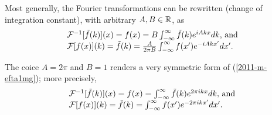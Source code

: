 Most generally, the Fourier transformations can be rewritten (change of integration constant),
 with arbitrary $A,B\in {\Bbb R}$,
as
\begin{equation}
\begin{array}{l}
 {\cal F}^{-1}[\tilde{f}(k)](x)=f(x)= B \int_{-\infty}^\infty \tilde{f}(k) e^{  iA{kx}} dk \textrm{, and} \\
 {\cal F}[f(x)](k)=\tilde{f}(k)=  \frac{A}{2\pi B} \int_{-\infty}^\infty  f(x') e^{- iA{kx'}} dx'
.
\end{array}
\label{2011-m-efta1mg}
\end{equation}

The coice $A=2\pi $ and $B=1$ renders a very symmetric form of (\ref{2011-m-efta1mg}); more precisely,
\begin{equation}
\begin{array}{l}
 {\cal F}^{-1}[\tilde{f}(k)](x)=f(x)=   \int_{-\infty}^\infty \tilde{f}(k) e^{  2\pi i{kx}} dk \textrm{, and} \\
 {\cal F}[f(x)](k)=\tilde{f}(k)=    \int_{-\infty}^\infty  f(x') e^{-  2\pi  i {kx'}} dx'
.
\end{array}
\label{2011-m-efta1mgAB1}
\end{equation}

